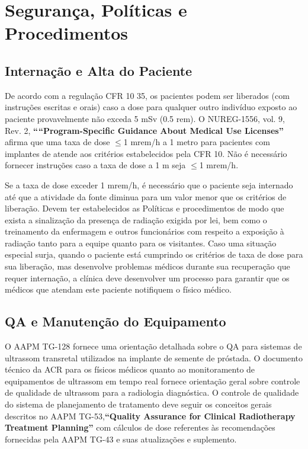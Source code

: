 \documentclass[11pt,a4paper]{article}
\begin{document}
\section{Segurança, Políticas e Procedimentos}

\subsection*{Internação e Alta do Paciente}

	De acordo com a regulação CFR 10 35, os pacientes podem ser liberados (com instruções escritas e orais) caso a dose para qualquer outro indivíduo exposto ao paciente provavelmente não exceda 5 mSv (0.5 rem). O  NUREG-1556, vol. 9, Rev. 2, \textbf{``“Program-Specific Guidance About Medical Use Licenses''} afirma que uma taxa de dose $\leq$1 mrem/h a 1 metro para pacientes com implantes de  atende aos critérios estabelecidos pela CFR 10. Não é necessário fornecer instruções caso a taxa de dose a 1 m seja $\leq$1 mrem/h.

	Se a taxa de dose exceder 1 mrem/h, é necessário que o paciente seja internado até que a atividade da fonte diminua para um valor menor que os critérios de liberação. Devem ter estabelecidos as Políticas e procedimentos de modo que exista a sinalização da presença de radiação exigida por lei, bem como o treinamento da enfermagem e outros funcionários com respeito a exposição à radiação tanto para a equipe quanto para os visitantes. Caso uma situação especial surja, quando o paciente está cumprindo os critérios de taxa de dose para sua liberação, mas desenvolve problemas médicos durante sua recuperação que requer internação, a clínica deve desenvolver um processo para garantir que os médicos que atendam este paciente notifiquem o físico médico.

\subsection*{QA e Manutenção do Equipamento}

	O AAPM TG-128 fornece uma orientação detalhada sobre o QA para sistemas de ultrassom transretal utilizados na implante de semente de próstada. O documento técnico da  ACR para os físicos médicos quanto ao monitoramento de equipamentos de ultrassom em tempo real fornece orientação geral sobre controle de qualidade de ultrassom para a radiologia diagnóstica. O controle de qualidade do sistema de planejamento de tratamento deve seguir os conceitos gerais descritos no AAPM TG-53,\textbf{``Quality Assurance for Clinical Radiotherapy Treatment Planning''}  com cálculos de dose referentes às recomendações fornecidas pela AAPM TG-43 e suas atualizações e suplemento.
\end{document}
